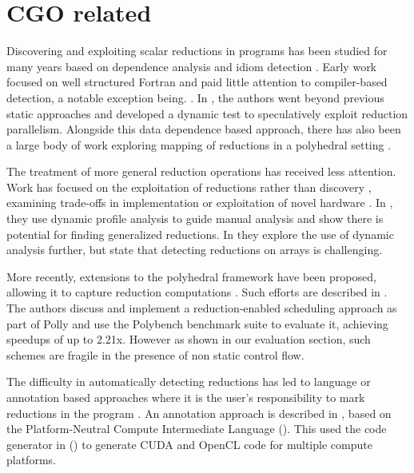 \section{CGO related}

    Discovering and exploiting scalar reductions in programs has been studied
    for many years based on dependence analysis and idiom detection
    \cite{pottenger1995idiom,suganuma1996detection,fisher1994parallelizing}.
    Early work focused on well structured Fortran and paid little attention to
    compiler-based detection, a notable exception being. 
    \cite{suganuma1996detection}. 
    In \cite{rauchwerger1999lrpd}, the authors went beyond previous static
    approaches and developed a dynamic test to speculatively exploit reduction
    parallelism.
    Alongside this data dependence based approach, there has also been a
    large body of work exploring mapping of reductions in a polyhedral setting
    \cite{redon1994scheduling, jouvelot1989unified}.

    The treatment of more general reduction operations has received less
    attention.
    Work has focused on the exploitation of reductions rather than discovery
    \cite{gutierrez2003optimization,gutierrez2008analytical, Gutierrez:2000},
    examining trade-offs in implementation \cite{yu2006adaptive} or exploitation
    of novel hardware \cite{ravi2010compiler,Huo2011HiPC}.
    In \cite{das2010experiences}, they use dynamic profile analysis to guide
    manual analysis and show there is potential for finding generalized
    reductions.
    In \cite{kim2012dynamic} they explore the use of dynamic analysis further,
    but state that detecting reductions on arrays is challenging.

    More recently, extensions to the polyhedral framework have been proposed,
    allowing it to capture reduction computations
    \cite{chi1997optimizing, gupta2006simplifying, stock2014framework}.
    Such efforts are described in \cite{Doerfert2015Polly}.
    The authors discuss and implement a reduction-enabled scheduling approach as
    part of Polly and use the Polybench benchmark suite to evaluate it,
    achieving speedups of up to 2.21x.
    However as shown in our evaluation section, such schemes are fragile in the
    presence of non static control flow.

    The difficulty in automatically detecting reductions has led to language or
    annotation based approaches where it is the user's responsibility to mark
    reductions in the program \cite{deitz2002high}.
    An annotation approach is described in \cite{Reddy2016Reduction}, based on
    the Platform-Neutral Compute Intermediate Language
    (\cite{baghdadi2015PENCIL}).
    This used the code generator in
    (\cite{Verdoolaege:2013:PPC:2400682.2400713}) to generate CUDA and OpenCL
    code for multiple compute platforms.


